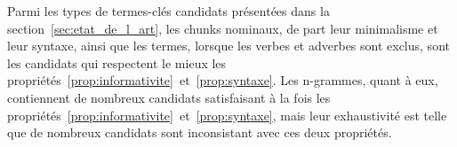     Parmi les types de termes-clés candidats présentées dans la
    section~\ref{sec:etat_de_l_art}, les chunks nominaux, de part leur
    minimalisme et leur syntaxe, ainsi que les termes, lorsque les verbes et
    adverbes sont exclus, sont les candidats qui respectent le mieux les
    propriétés~\ref{prop:informativite}~et~\ref{prop:syntaxe}. Les n-grammes,
    quant à eux, contiennent de nombreux candidats satisfaisant à la fois les
    propriétés~\ref{prop:informativite}~et~\ref{prop:syntaxe}, mais leur
    exhaustivité est telle que de nombreux candidats sont inconsistant avec
    ces deux propriétés.

